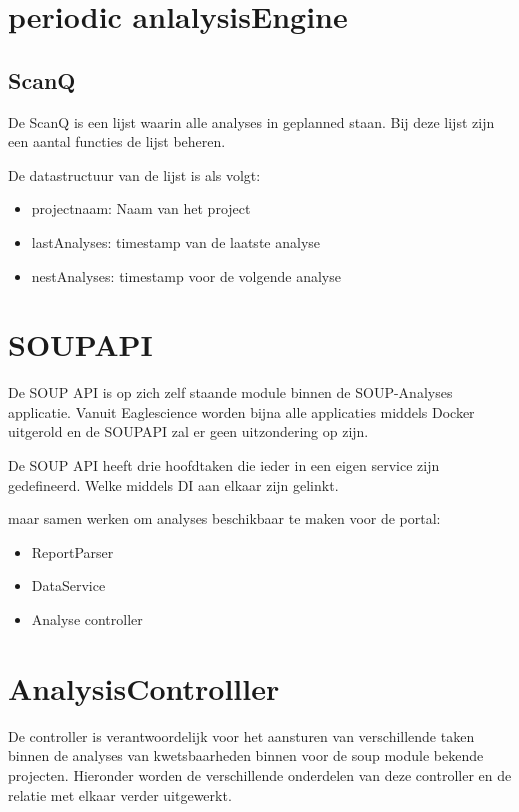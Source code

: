 \section{periodic anlalysisEngine}

\subsection{ScanQ}
De ScanQ is een lijst waarin alle analyses in geplanned staan. Bij deze lijst zijn een aantal functies de lijst beheren.

De datastructuur van de lijst is als volgt:
\begin{itemize}
    \item projectnaam: Naam van het project
    \item lastAnalyses: timestamp van de laatste analyse
    \item nestAnalyses: timestamp voor de volgende analyse
\end{itemize}





\section{SOUPAPI}\label{sec:soupapi}
De SOUP API is op zich zelf staande module binnen de SOUP-Analyses applicatie. Vanuit Eaglescience worden bijna alle applicaties middels Docker uitgerold en de SOUPAPI zal er geen uitzondering op zijn.

De SOUP API heeft drie hoofdtaken die ieder in een eigen service zijn gedefineerd. Welke middels DI aan elkaar zijn gelinkt.

maar samen werken om analyses beschikbaar te maken voor de portal:
\begin{itemize}
    \item ReportParser
    \item DataService
    \item Analyse controller
\end{itemize}





\section{AnalysisControlller}\label{sec:Implcontroller}
De controller is verantwoordelijk voor het aansturen van verschillende taken binnen de analyses van kwetsbaarheden binnen voor de soup module bekende projecten. Hieronder worden de verschillende onderdelen van deze controller en de relatie met elkaar verder uitgewerkt.

